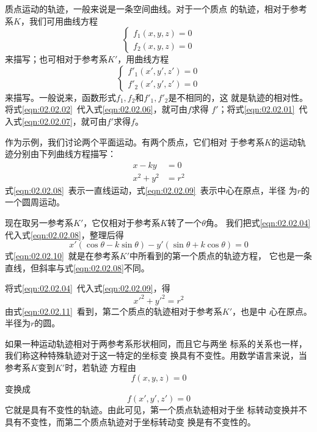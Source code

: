 质点运动的轨迹，一般来说是一条空间曲线。对于一个质点
的轨迹，相对于参考系$ K $，我们可用曲线方程
\begin{equation}\label{eqn:02.02.06}
  \left\{\begin{array}{l}
    f_1\left(x,y,z\right)=0 \\
    f_2\left(x,y,z\right)=0
  \end{array}\right.
\end{equation}
来描写；也可相对于参考系$K'$，用曲线方程
\clearpage
\begin{equation}\label{eqn:02.02.07}
  \left\{\begin{array}{l}
    f'_1\left(x',y',z'\right)=0 \\
    f'_2\left(x',y',z'\right)=0
  \end{array}\right.
\end{equation}
来描写。一般说来，函数形式$f_1,f_2$和$f'_1,f'_2$是不相同的，这
就是轨迹的相对性。将式\eqref{eqn:02.02.02}~代入式\eqref{eqn:02.02.06}，就可由$f$求得
$f'$；将式\eqref{eqn:02.02.01}~代入式\eqref{eqn:02.02.07}，就可由$f'$求得$f$。

作为示例，我们讨论两个平面运动。有两个质点，它们相对
于参考系$K$的运动轨迹分别由下列曲线方程描写：
\begin{align}
  x-ky    & =0 \label{eqn:02.02.08}   \\
  x^2+y^2 & =r^2 \label{eqn:02.02.09}
\end{align}
式\eqref{eqn:02.02.08}~表示一直线运动，式\eqref{eqn:02.02.09}~表示中心在原点，半径
为$r$的一个圆周运动。

现在取另一参考系$K'$，它仅相对于参考系$K$转了一个$\theta$角。
我们把式\eqref{eqn:02.02.04}代入式\eqref{eqn:02.02.08}，整理后得
{\setlength{\mathindent}{4em}
\begin{equation}\label{eqn:02.02.10}
  x'\left(\cos\theta - k\sin\theta\right)-y'\left(\sin\theta + k\cos\theta\right)=0
\end{equation}}%
式\eqref{eqn:02.02.10}~就是在参考系$K'$中所看到的第一个质点的轨迹方程，
它也是一条直线，但斜率与式\eqref{eqn:02.02.08}不同。

将式\eqref{eqn:02.02.04}~代入式\eqref{eqn:02.02.09}，得
\begin{equation}\label{eqn:02.02.11}
  x'^2+y'^2=r^2
\end{equation}
由式\eqref{eqn:02.02.11}~看到，第二个质点的轨迹相对于参考系$K'$，也是中
心在原点。半径为$r$的圆。

如果一种运动轨迹相对于两参考系形状相同，而且它与两坐
标系的关系也一样，我们称这种特殊轨迹对于这一特定的坐标变
换具有不变性。用数学语言来说，当参考系$K$变到$K'$时，若轨迹
方程由
\begin{equation*}
  f\left(x,y,z\right)=0
\end{equation*}
变换成
\begin{equation*}
  f\left(x',y',z'\right)=0
\end{equation*}
它就是具有不变性的轨迹。由此可见，第一个质点轨迹相对于坐
标转动变换并不具有不变性，而第二个质点轨迹对于坐标转动变
换是有不变性的。

